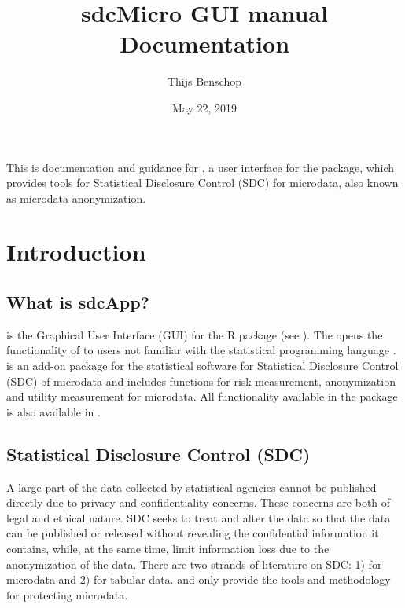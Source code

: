 \documentclass[letterpaper,10pt,english]{sphinxmanual}
\title{sdcMicro GUI manual Documentation}
\date{May 22, 2019}
\author{Thijs Benschop}
\begin{document}
\maketitle
\sphinxtableofcontents
{}\label{\detokenize{index::doc}}


This is documentation and guidance for , a user interface for the  
package, which provides tools for Statistical Disclosure Control (SDC) for microdata,
also known as microdata anonymization.


\chapter{Introduction}
\label{\detokenize{introduction::doc}}\label{\detokenize{introduction:introduction}}\label{\detokenize{introduction:sdcapp-manual}}

\section{What is sdcApp?}
\label{\detokenize{introduction:what-is-sdcapp}}
 is the Graphical User Interface (GUI) for the R package  (see
). The 
opens the functionality of  to users not familiar with the statistical
programming language .  is an add-on package for the statistical software 
for Statistical Disclosure Control (SDC) of microdata and includes functions for risk measurement,
anonymization and utility measurement for
microdata. All functionality available in the  package is also available in .


\section{Statistical Disclosure Control (SDC)}
\label{\detokenize{introduction:statistical-disclosure-control-sdc}}
A large part of the data collected by statistical agencies cannot be published directly
due to privacy and confidentiality concerns. These concerns are both of legal and ethical
nature. SDC seeks to treat and alter the data so that the data can be published or
released without revealing the confidential information it contains, while, at the same time,
limit information loss due to the anonymization of the data. There are two strands of literature
on SDC: 1) for microdata and 2) for tabular data.  and  only provide the tools
and methodology for protecting microdata.
\end{document}
